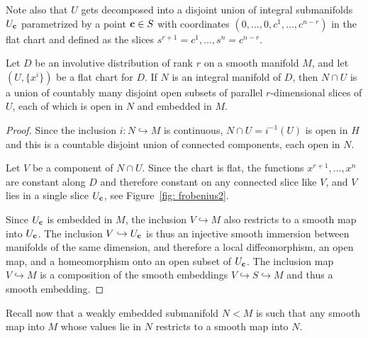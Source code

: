 Note also that $U$ gets decomposed into a disjoint union of integral submanifolds $U_{\bf{c}}$ parametrized by a point $\bf{c}\in S$ with coordinates $(0,\ldots,0,c^1,\ldots,c^{n-r})$ in the flat chart and defined as the slices $s^{r+1}=c^1,\ldots, s^n=c^{n-r}$.

\begin{prop}\label{prop 19.16 Lee}
    Let $D$ be an involutive distribution of rank $r$ on a smooth manifold $M$, and let $(U,\{x^i\})$ be a flat chart for $D$. If $N$ is an integral manifold of $D$, then $N\cap U$ is a union of countably many disjoint open subsets of parallel $r$-dimensional slices of $U$, each of which is open in $N$ and embedded in $M$.
\end{prop}
\begin{proof}
    Since the inclusion $i:N\hookrightarrow M$ is continuous, $N\cap U=i^{-1}(U)$ is open in $H$ and this is a countable disjoint union of connected components, each open in $N$.

    Let $V$ be a component of $N\cap U$. Since the chart is flat, the functions $x^{r+1},\ldots,x^n$ are constant along $D$ and therefore constant on any connected slice like $V$, and $V$ lies in a single slice $U_{\bf{c}}$, see Figure~\ref{fig: frobenius2}.

    Since $U_{\bf{c}}$ is embedded in $M$, the inclusion $V\hookrightarrow M$ also restricts to a smooth map into $U_{\bf{c}}$. The inclusion $V\hookrightarrow U_{\bf{c}}$ is thus an injective smooth immersion between manifolds of the same dimension, and therefore a local diffeomorphism, an open map, and a homeomorphism onto an open subset of $U_{\bf{c}}$. The inclusion map $V\hookrightarrow M$ is a composition of the smooth embeddings $V\hookrightarrow S\hookrightarrow M$ and thus a smooth embedding.
\end{proof}

Recall now that a weakly embedded submanifold $N<M$ is such that any smooth map into $M$ whose values lie in $N$ restricts to a smooth map into $N$.

